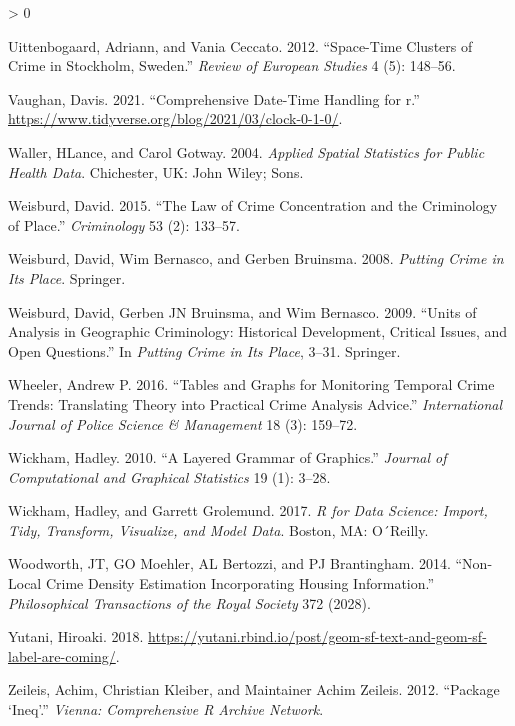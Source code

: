 \documentclass[
  krantz2]{krantz}
\newlength{\cslhangindent}
\newenvironment{CSLReferences}[2] %
 {%
  \setlength{\parindent}{0pt}
  \ifodd #1 \everypar{\setlength{\hangindent}{\cslhangindent}}\ignorespaces\fi
  \ifnum #2 > 0
  \setlength{\parskip}{#2\baselineskip}
  \fi
 }%
 {}
\begin{document}
\begin{CSLReferences}{1}{0}
\leavevmode\hypertarget{ref-Uittenbogaard_2012}{}%
Uittenbogaard, Adriann, and Vania Ceccato. 2012. {``Space-Time Clusters of Crime in Stockholm, Sweden.''} \emph{Review of European Studies} 4 (5): 148--56.

\leavevmode\hypertarget{ref-Vaughan_2021}{}%
Vaughan, Davis. 2021. {``Comprehensive Date-Time Handling for r.''} \url{https://www.tidyverse.org/blog/2021/03/clock-0-1-0/}.

\leavevmode\hypertarget{ref-Waller_2004}{}%
Waller, HLance, and Carol Gotway. 2004. \emph{Applied Spatial Statistics for Public Health Data}. Chichester, UK: John Wiley; Sons.

\leavevmode\hypertarget{ref-Weisburd_2015}{}%
Weisburd, David. 2015. {``The Law of Crime Concentration and the Criminology of Place.''} \emph{Criminology} 53 (2): 133--57.

\leavevmode\hypertarget{ref-Weisburd_2008}{}%
Weisburd, David, Wim Bernasco, and Gerben Bruinsma. 2008. \emph{Putting Crime in Its Place}. Springer.

\leavevmode\hypertarget{ref-Weisburd_2009}{}%
Weisburd, David, Gerben JN Bruinsma, and Wim Bernasco. 2009. {``Units of Analysis in Geographic Criminology: Historical Development, Critical Issues, and Open Questions.''} In \emph{Putting Crime in Its Place}, 3--31. Springer.

\leavevmode\hypertarget{ref-Wheeler_2016}{}%
Wheeler, Andrew P. 2016. {``Tables and Graphs for Monitoring Temporal Crime Trends: Translating Theory into Practical Crime Analysis Advice.''} \emph{International Journal of Police Science \& Management} 18 (3): 159--72.

\leavevmode\hypertarget{ref-Wickham_2010}{}%
Wickham, Hadley. 2010. {``A Layered Grammar of Graphics.''} \emph{Journal of Computational and Graphical Statistics} 19 (1): 3--28.

\leavevmode\hypertarget{ref-Wickham_2017}{}%
Wickham, Hadley, and Garrett Grolemund. 2017. \emph{R for Data Science: Import, Tidy, Transform, Visualize, and Model Data}. Boston, MA: O´Reilly.

\leavevmode\hypertarget{ref-Woodworth_2014}{}%
Woodworth, JT, GO Moehler, AL Bertozzi, and PJ Brantingham. 2014. {``Non-Local Crime Density Estimation Incorporating Housing Information.''} \emph{Philosophical Transactions of the Royal Society} 372 (2028).

\leavevmode\hypertarget{ref-Yutani_2018}{}%
Yutani, Hiroaki. 2018. \url{https://yutani.rbind.io/post/geom-sf-text-and-geom-sf-label-are-coming/}.

\leavevmode\hypertarget{ref-zeileis2012package}{}%
Zeileis, Achim, Christian Kleiber, and Maintainer Achim Zeileis. 2012. {``Package {`Ineq'}.''} \emph{Vienna: Comprehensive R Archive Network}.

\end{CSLReferences}

\backmatter
\printindex
\end{document}
